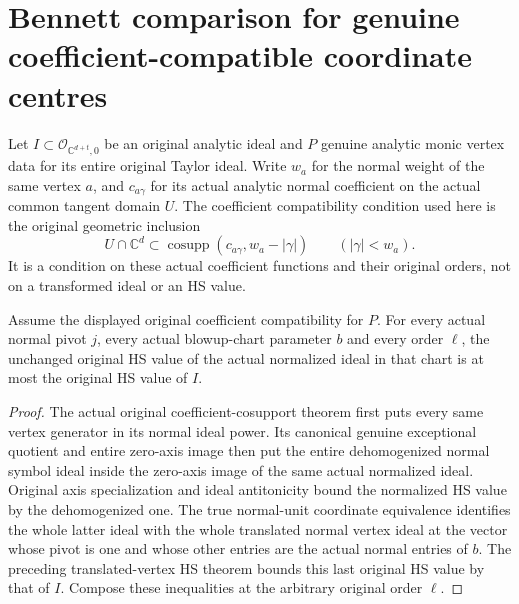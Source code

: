 \section{Bennett comparison for genuine coefficient-compatible coordinate centres}

Let $I\subset\mathcal O_{\mathbb C^{d+t},0}$ be an original analytic
ideal and $P$ genuine analytic monic vertex data for its entire original
Taylor ideal. Write $w_a$ for the normal weight of the same vertex $a$,
and $c_{a\gamma}$ for its actual analytic normal coefficient on the
actual common tangent domain $U$. The coefficient compatibility
condition used here is the original geometric inclusion
\[
 U\cap\mathbb C^d\subset
 \operatorname{cosupp}(c_{a\gamma},w_a-|\gamma|)
 \qquad (|\gamma|<w_a).
\]
It is a condition on these actual coefficient functions and their
original orders, not on a transformed ideal or an HS value.

\begin{theorem}
\label{hir:actual-coefficient-centre-normalized-bennett}
\leanok
Assume the displayed original coefficient compatibility for $P$. For
every actual normal pivot $j$, every actual blowup-chart parameter $b$
and every order $\ell$, the unchanged original HS value of the actual
normalized ideal in that chart is at most the original HS value of $I$.
\end{theorem}
\begin{proof}
The actual original coefficient-cosupport theorem first puts every
same vertex generator in its normal ideal power. Its canonical genuine
exceptional quotient and entire zero-axis image then put the entire
dehomogenized normal symbol ideal inside the zero-axis image of the
same actual normalized ideal. Original axis specialization and ideal
antitonicity bound the normalized HS value by the dehomogenized one.
The true normal-unit coordinate equivalence identifies the whole latter
ideal with the whole translated normal vertex ideal at the vector whose
pivot is one and whose other entries are the actual normal entries of
$b$. The preceding translated-vertex HS theorem bounds this last
original HS value by that of $I$. Compose these inequalities at the
arbitrary original order $\ell$.
\end{proof}

